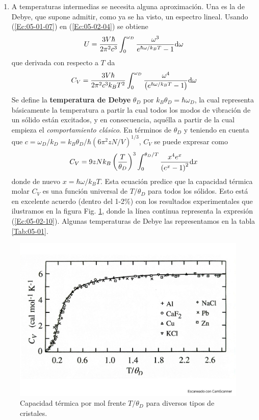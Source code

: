\begin{enumerate}
    \item A temperaturas intermedias se necesita alguna aproximación. Una es la de Debye, que supone admitir, como ya se ha visto, un espectro lineal. Usando (\ref{Ec:05-01-07}) en (\ref{Ec:05-02-04}) se obtiene 
    \begin{equation}
        U = \frac{3V\hbar}{2 \pi^2 c^3} \int_0^{\omega_D} \frac{\omega^3}{e^{\hbar \omega/k_B T} - 1} \mathrm{d} \omega
    \end{equation}
    que derivada con respecto a $T$ da
    \begin{equation}
        C_V = \frac{3V\hbar}{2 \pi^2 c^3 k_B T^2} \int_0^{\omega_D} \frac{\omega^4}{\left( e^{\hbar \omega/k_B T} - 1 \right)} \mathrm{d} \omega
    \end{equation}
    Se define la \textbf{temperatura de Debye} $\theta_D$ por $k_B\theta_D=\hbar \omega_D$, la cual representa básicamente la temperatura a partir la cual todos los modos de vibración de un sólido están excitados, y en consecuencia, aquélla a partir de la cual empieza el \textit{comportamiento clásico}. En términos de $\theta_D$ y teniendo en cuenta que $c=\omega_D /k_D = k_B \theta_D / \hbar (6 \pi^2 z N/V)^{1/3}$, $C_V$ se puede expresar como
    \begin{equation}
        C_V = 9zNk_B \left( \frac{T}{\theta_D} \right)^3 \int_0^{\theta_D/T} \frac{x^4 e^x}{\left( e^x-1 \right)^2}\mathrm{d} x \label{Ec:05-02-10}
    \end{equation}
    donde de nuevo $x=\hbar \omega / k_B T$. Esta ecuación predice que la capacidad térmica molar $C_V$ es una función universal de $T/\theta_D$ para todos los sólidos. Esto está en excelente acuerdo (dentro del 1-2\%) con los resultados experimentales que ilustramos en la figura Fig. \ref{Fig:05-04}, donde la línea continua representa la expresión (\ref{Ec:05-02-10}). Algunas temperaturas de Debye las representamos en la tabla \ref{Tab:05-01}.
\end{enumerate}

\begin{figure}[h!] \centering
    \includegraphics[scale=0.35]{Cuerpo/Ch_05/Fotos libro 4.pdf}
    \caption{Capacidad térmica por mol frente $T/\theta_D$ para diversos tipos de cristales.}
    \label{Fig:05-04}
\end{figure}    

